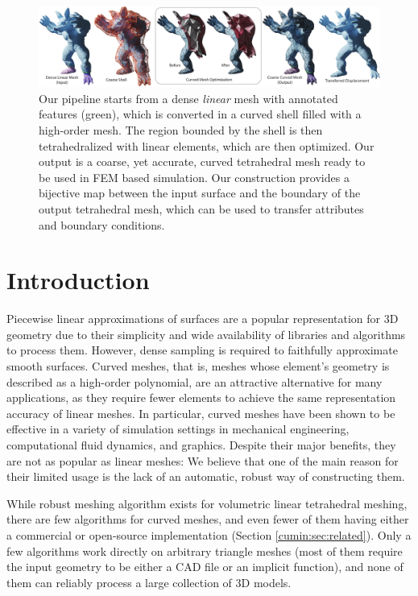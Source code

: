 
\begin{figure}
    \centering
    \includegraphics[width=\linewidth]{curve_meshing_in_shell_tex/figs/teaser}
    \caption{Our pipeline starts from a dense \emph{linear} mesh with annotated features (green), 
    which is converted in a curved shell filled with a high-order mesh. The region bounded by the shell is then tetrahedralized with linear elements, which are then optimized. Our output is a coarse, yet accurate, curved tetrahedral mesh ready to be used in FEM based simulation. Our construction provides a bijective map between the input surface and the boundary of the output tetrahedral mesh, which can be used to transfer attributes and boundary conditions.}
    \label{bichon:fig:teaser}
\end{figure}

\section{Introduction}

Piecewise linear approximations of surfaces are a popular representation for 3D geometry due to their simplicity and wide availability of libraries and algorithms to process them. However, dense sampling is required to faithfully approximate smooth surfaces. 
%
Curved meshes, that is, meshes whose element's geometry is described as a high-order polynomial, are an attractive alternative for many applications, as they require fewer elements to achieve the same representation accuracy of linear meshes. In particular, curved meshes have been shown to be effective in a variety of simulation settings in mechanical engineering, computational fluid dynamics, and graphics. Despite their major benefits, they are not as popular as linear meshes: We believe that {one of} the main reason for their limited usage is the lack of an automatic, robust way of constructing them. 

While robust meshing algorithm exists for volumetric linear tetrahedral meshing, there are few algorithms for curved meshes, and even fewer of them having either a commercial or open-source implementation (Section \ref{cumin:sec:related}). Only {a} few algorithms work directly on arbitrary triangle meshes (most of them require the input geometry to be either a CAD file or an implicit function), and none of them can reliably process a large collection of 3D models. 

